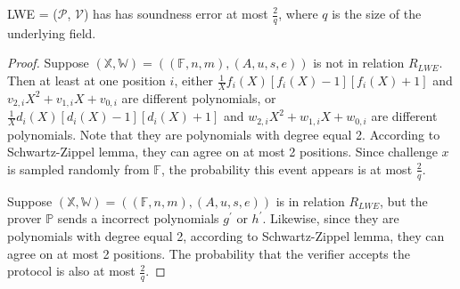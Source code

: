 \begin{lemma}
\label{lemma:lwese}

LWE = ($\mathcal{P}$, $\mathcal{V}$) has has soundness error at most $\frac{2}{q}$, where $q$ is the size of the underlying field.

\end{lemma}
\begin{proof}

Suppose $(\mathbb{X}, \mathbb{W}) = ((\mathbb{F}, n, m), (A, u, s, e))$ is not in relation $R_{LWE}$. 
Then at least at one position $i$, either $\frac{1}{X} f_i(X)[f_i(X) - 1][f_i(X) + 1]$ and $v_{2, i}X^2 + v_{1, i}X + v_{0, i}$ are different polynomials, or $\frac{1}{X} d_i(X)[d_i(X) - 1][d_i(X) + 1]$ and $w_{2, i}X^2 + w_{1, i}X + w_{0, i}$ are different polynomials. Note that they are polynomials with degree equal 2. According to Schwartz-Zippel lemma, they can agree on at most 2 positions. Since challenge $x$ is sampled randomly from $\mathbb{F}$, the probability this event appears is at most $\frac{2}{q}$.

Suppose $(\mathbb{X}, \mathbb{W}) = ((\mathbb{F}, n, m), (A, u, s, e))$ is in relation $R_{LWE}$, but the prover $\mathbb{P}$ sends a incorrect polynomials $g^\prime$ or $h^\prime$. Likewise, since they are polynomials with degree equal 2, according to Schwartz-Zippel lemma, they can agree on at most 2 positions. The probability that the verifier accepts the protocol is also at most $\frac{2}{q}$.


\end{proof}


